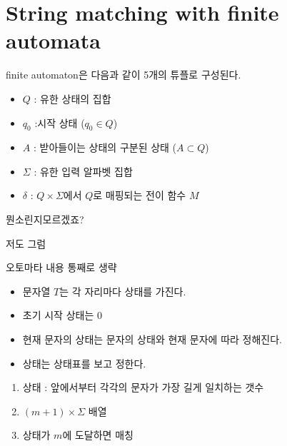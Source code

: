 \section{String matching with finite automata}

\begin{frame}
\begin{dfn}[automata]
    finite automaton은 다음과 같이 5개의 튜플로 구성된다.
    \begin{itemize}
        \item $Q$ : 유한 상태의 집합
        \item $q_0$ :시작 상태 ($q_0 \in Q$)
        \item $A$ : 받아들이는 상태의 구분된 상태 ($A \subset Q$)
        \item $\Sigma$ : 유한 입력 알파벳 집합
        \item $\delta$ : $Q \times \Sigma$에서 $Q$로 매핑되는 전이 함수 $M$    \end{itemize}
\end{dfn}
\end{frame}

\begin{frame}
    
뭔소린지모르겠죠?

저도 그럼

오토마타 내용 통째로 생략
\end{frame}

\begin{frame}
    \begin{itemize}
        \item 문자열 $T$는 각 자리마다 상태를 가진다.
        \item 초기 시작 상태는 0
        \item 현재 문자의 상태는 문자의 상태와 현재 문자에 따라 정해진다.
        \item 상태는 상태표를 보고 정한다.
    \end{itemize}
\end{frame}


\begin{frame}
    \begin{enumerate}
        \item 상태 : 앞에서부터 각각의 문자가 가장 길게 일치하는 갯수
        \item $(m+1) \times \Sigma$ 배열
        \item 상태가 $m$에 도달하면 매칭
    \end{enumerate}
\end{frame}

